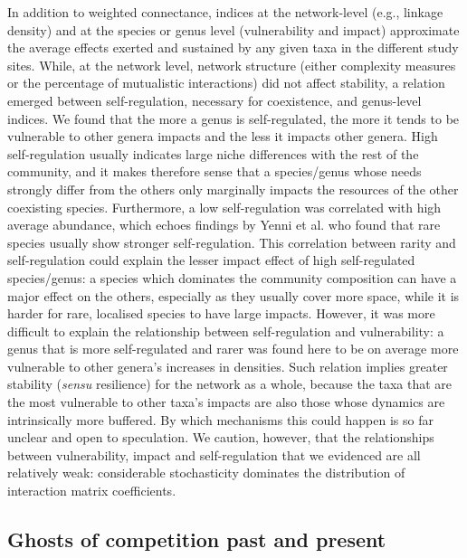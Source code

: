 \documentclass[9pt,twocolumn,twoside,lineno]{pnas-new}
\begin{document}
In addition to weighted connectance, indices at the network-level
(e.g., linkage density) and at the species or genus level (vulnerability
and impact) approximate the average effects exerted and sustained
by any given taxa in the different study sites. While, at the network
level, network structure (either complexity measures or the percentage
of mutualistic interactions) did not affect stability, a relation
emerged between self-regulation, necessary for coexistence, and genus-level
indices. We found that the more a genus is self-regulated, the more
it tends to be vulnerable to other genera impacts and the less it
impacts other genera. High self-regulation usually indicates large
niche differences with the rest of the community, and it makes therefore
sense that a species/genus whose needs strongly differ from the others
only marginally impacts the resources of the other coexisting species.
Furthermore, a low self-regulation was correlated with high average
abundance, which echoes findings by Yenni et al. \cite{yenni_persistent_2017}
who found that rare species usually show stronger self-regulation.
This correlation between rarity and self-regulation could explain
the lesser impact effect of high self-regulated species/genus: a species
which dominates the community composition can have a major effect
on the others, especially as they usually cover more space, while
it is harder for rare, localised species to have large impacts. However,
it was more difficult to explain the relationship between self-regulation
and vulnerability: a genus that is more self-regulated and rarer was
found here to be on average more vulnerable to other genera's increases
in densities. Such relation implies greater stability (\emph{sensu}
resilience) for the network as a whole, because the taxa that are
the most vulnerable to other taxa's impacts are also those whose dynamics
are intrinsically more buffered. By which mechanisms this could happen
is so far unclear and open to speculation. We caution, however, that
the relationships between vulnerability, impact and self-regulation
that we evidenced are all relatively weak: considerable stochasticity
dominates the distribution of interaction matrix coefficients.

\subsection*{Ghosts of competition past and present}
\end{document}
